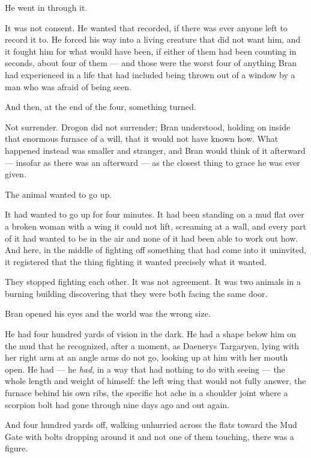 He went in through it.

\sceneBreak

It was not consent. He wanted that recorded, if there was ever anyone left to record it to. He forced his way into a living creature that did not want him, and it fought him for what would have been, if either of them had been counting in seconds, about four of them — and those were the worst four of anything Bran had experienced in a life that had included being thrown out of a window by a man who was afraid of being seen.

And then, at the end of the four, something turned.

Not surrender. Drogon did not surrender; Bran understood, holding on inside that enormous furnace of a will, that it would not have known how. What happened instead was smaller and stranger, and Bran would think of it afterward — insofar as there was an afterward — as the closest thing to grace he was ever given.

The animal wanted to go up.

It had wanted to go up for four minutes. It had been standing on a mud flat over a broken woman with a wing it could not lift, screaming at a wall, and every part of it had wanted to be in the air and none of it had been able to work out how. And here, in the middle of fighting off something that had come into it uninvited, it registered that the thing fighting it wanted precisely what it wanted.

They stopped fighting each other. It was not agreement. It was two animals in a burning building discovering that they were both facing the same door.

\sceneBreak

Bran opened his eyes and the world was the wrong size.

He had four hundred yards of vision in the dark. He had a shape below him on the mud that he recognized, after a moment, as Daenerys Targaryen, lying with her right arm at an angle arms do not go, looking up at him with her mouth open. He had — he \textit{had}, in a way that had nothing to do with seeing — the whole length and weight of himself: the left wing that would not fully answer, the furnace behind his own ribs, the specific hot ache in a shoulder joint where a scorpion bolt had gone through nine days ago and out again.

And four hundred yards off, walking unhurried across the flats toward the Mud Gate with bolts dropping around it and not one of them touching, there was a figure.

